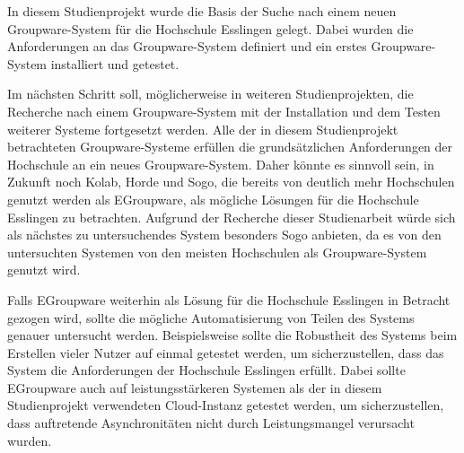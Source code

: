 In diesem Studienprojekt wurde die Basis der Suche nach einem neuen Groupware-System für die Hochschule Esslingen gelegt.
Dabei wurden die Anforderungen an das Groupware-System definiert und ein erstes Groupware-System installiert und getestet.

Im nächsten Schritt soll, möglicherweise in weiteren Studienprojekten, die Recherche nach einem Groupware-System mit der Installation und dem Testen weiterer Systeme fortgesetzt werden.
Alle der in diesem Studienprojekt betrachteten Groupware-Systeme erfüllen die grundsätzlichen Anforderungen der Hochschule an ein neues Groupware-System.
Daher könnte es sinnvoll sein, in Zukunft noch Kolab, Horde und Sogo, die bereits von deutlich mehr Hochschulen genutzt werden als EGroupware, als mögliche Lösungen für die Hochschule Esslingen zu betrachten.
Aufgrund der Recherche dieser Studienarbeit würde sich als nächstes zu untersuchendes System besonders Sogo anbieten, da es von den untersuchten Systemen von den meisten Hochschulen als Groupware-System genutzt wird.

Falls EGroupware weiterhin als Lösung für die Hochschule Esslingen in Betracht gezogen wird, sollte die mögliche Automatisierung von Teilen des Systems genauer untersucht werden.
Beispielsweise sollte die Robustheit des Systems beim Erstellen vieler Nutzer auf einmal getestet werden, um sicherzustellen, dass das System die Anforderungen der Hochschule Esslingen erfüllt.
Dabei sollte EGroupware auch auf leistungsstärkeren Systemen als der in diesem Studienprojekt verwendeten Cloud-Instanz getestet werden, um sicherzustellen, dass auftretende Asynchronitäten nicht durch Leistungsmangel verursacht wurden.


